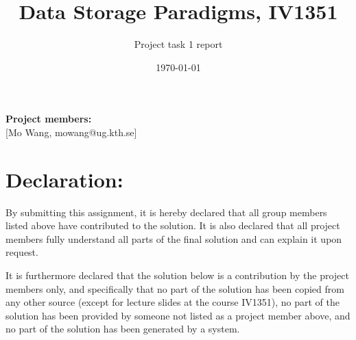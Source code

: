 \documentclass[a4paper]{scrartcl}
\title{Data Storage Paradigms, IV1351}
\subtitle{Project task 1 report}
\author{}
\date{\today}
\renewcommand{\_}{\textunderscore\allowbreak}
\begin{document}
\maketitle
\noindent\textbf{Project members:} \\ \hfill
[Mo Wang, mowang@ug.kth.se] \\ \hfill

\section*{Declaration:}

By submitting this assignment, it is hereby declared that all group members listed above have contributed to the solution. It is also declared that all project members fully understand all parts of the final solution and can explain it upon request.

It is furthermore declared that the solution below is a contribution by the project members only, and specifically that no part of the solution has been copied from any other source (except for lecture slides at the course IV1351), no part of the solution has been provided by someone not listed as a project member above, and no part of the solution has been generated by a system.




\end{document}
